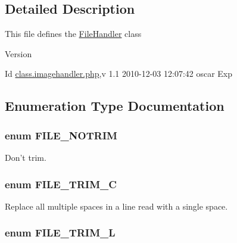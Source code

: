 \subsection{Detailed Description}
This file defines the \hyperlink{classFileHandler}{FileHandler} class \begin{DoxyVersion}{Version}

\end{DoxyVersion}
\begin{DoxyParagraph}{Id}
\hyperlink{class_8imagehandler_8php}{class.imagehandler.php},v 1.1 2010-\/12-\/03 12:07:42 oscar Exp 
\end{DoxyParagraph}


\subsection{Enumeration Type Documentation}
\subsubsection[{FILE\_\-NOTRIM}]{\setlength{\rightskip}{0pt plus 5cm}enum {\bf FILE\_\-NOTRIM}}\label{class_8imagehandler_8php_a3720f2e15eb9e16e29d8ecbb96763662}


Don't trim. 

\subsubsection[{FILE\_\-TRIM\_\-C}]{\setlength{\rightskip}{0pt plus 5cm}enum {\bf FILE\_\-TRIM\_\-C}}\label{class_8imagehandler_8php_a2787c3a1ecef8697c863800d0b2848a4}


Replace all multiple spaces in a line read with a single space. 

\subsubsection[{FILE\_\-TRIM\_\-L}]{\setlength{\rightskip}{0pt plus 5cm}enum {\bf FILE\_\-TRIM\_\-L}}\label{class_8imagehandler_8php_a080de95fd7cf2e8d8ac78ac7ad9471ee}



